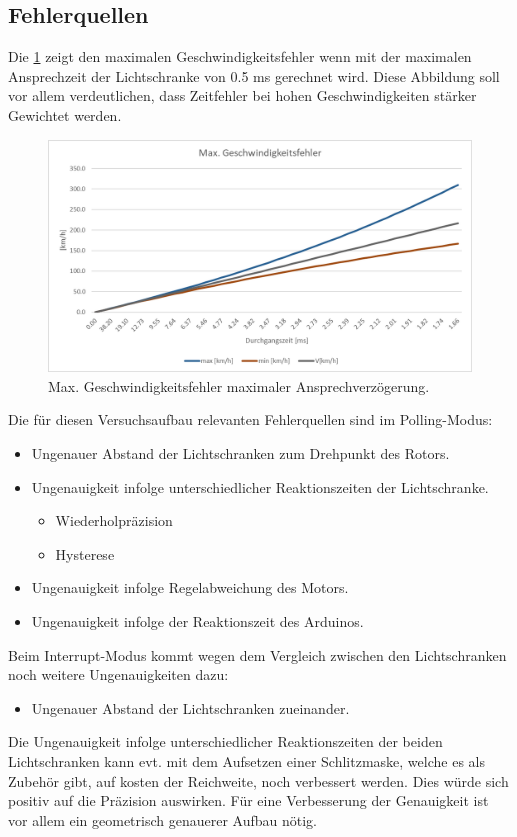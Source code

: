 \subsection{Fehlerquellen}
Die \ref{fig:AuswertungZeitfehler} zeigt den maximalen Geschwindigkeitsfehler wenn mit der maximalen Ansprechzeit der Lichtschranke von 0.5 ms gerechnet wird. Diese Abbildung soll vor allem verdeutlichen, dass Zeitfehler bei hohen Geschwindigkeiten stärker Gewichtet werden.

\begin{figure}[ht]
    \centering
    \includegraphics[width=\textwidth]{images/Zeitfehler.png}
    \caption{Max. Geschwindigkeitsfehler maximaler Ansprechverzögerung.}
    \label{fig:AuswertungZeitfehler}
\end{figure}

Die für diesen Versuchsaufbau relevanten Fehlerquellen sind im Polling-Modus:
\begin{itemize}
    \item Ungenauer Abstand der Lichtschranken zum Drehpunkt des Rotors.
    \item Ungenauigkeit infolge unterschiedlicher Reaktionszeiten der Lichtschranke.
    \begin{itemize}
        \item Wiederholpräzision
        \item Hysterese
    \end{itemize}
    \item Ungenauigkeit infolge Regelabweichung des Motors.
    \item Ungenauigkeit infolge der Reaktionszeit des Arduinos.
\end{itemize}

Beim Interrupt-Modus kommt wegen dem Vergleich zwischen den Lichtschranken noch weitere Ungenauigkeiten dazu:
\begin{itemize}
    \item Ungenauer Abstand der Lichtschranken zueinander.
\end{itemize}
Die Ungenauigkeit infolge unterschiedlicher Reaktionszeiten der beiden Lichtschranken kann evt. mit dem Aufsetzen einer Schlitzmaske, welche es als Zubehör gibt, auf kosten der Reichweite, noch verbessert werden. Dies würde sich positiv auf die Präzision auswirken. Für eine Verbesserung der Genauigkeit ist vor allem ein geometrisch genauerer Aufbau nötig. \\

